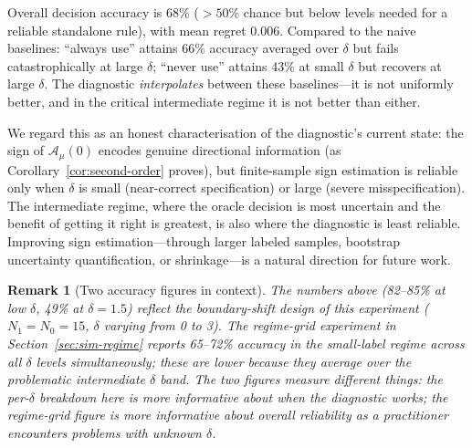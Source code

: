 \documentclass[11pt]{article}
\newtheorem{remark}{Remark}
\theoremstyle{definition}
\newcommand{\calA}{\mathcal{A}}
\begin{document}
Overall decision accuracy is 68\% (\(>50\%\) chance but below levels
needed for a reliable standalone rule), with mean regret 0.006.
Compared to the naive baselines:
``always use'' attains 66\% accuracy averaged over \(\delta\) but
fails catastrophically at large \(\delta\);
``never use'' attains 43\% at small \(\delta\) but recovers at large \(\delta\).
The diagnostic \emph{interpolates} between these baselines---it is not
uniformly better, and in the critical intermediate regime it is not better
than either.

We regard this as an honest characterisation of the diagnostic's current
state: the sign of \(\calA_\mu(0)\) encodes genuine directional information
(as Corollary~\ref{cor:second-order} proves), but finite-sample sign
estimation is reliable only when \(\delta\) is small (near-correct
specification) or large (severe misspecification).
The intermediate regime, where the oracle decision is most uncertain and
the benefit of getting it right is greatest, is also where the diagnostic
is least reliable.
Improving sign estimation---through larger labeled samples, bootstrap
uncertainty quantification, or shrinkage---is a natural direction for
future work.

\begin{remark}[Two accuracy figures in context]
The numbers above (82--85\% at low \(\delta\), 49\% at \(\delta=1.5\)) reflect
the \emph{boundary-shift design} of this experiment (\(N_1=N_0=15\),
\(\delta\) varying from 0 to 3).
The regime-grid experiment in Section~\ref{sec:sim-regime} reports 65--72\%
accuracy in the small-label regime across all \(\delta\) levels simultaneously;
these are lower because they average over the problematic intermediate \(\delta\)
band.
The two figures measure different things: the per-\(\delta\) breakdown here
is more informative about \emph{when} the diagnostic works;
the regime-grid figure is more informative about \emph{overall reliability} as
a practitioner encounters problems with unknown \(\delta\).
\end{remark}
\end{document}
